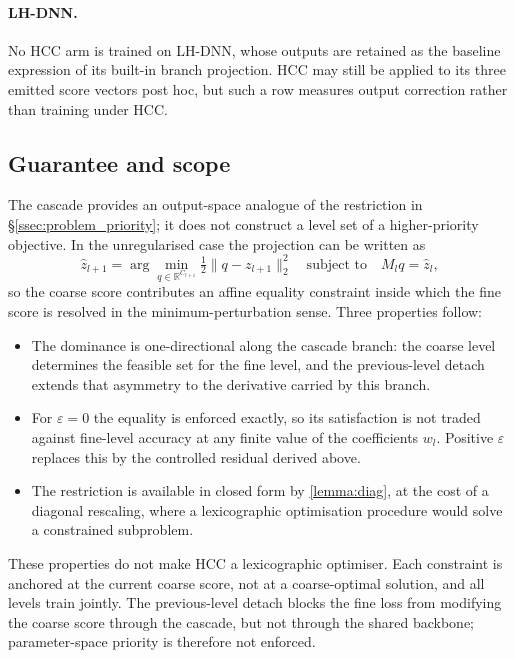 \paragraph{LH-DNN.} No HCC arm is trained on LH-DNN, whose outputs are retained
as the baseline expression of its built-in branch projection. HCC may still be
applied to its three emitted score vectors post hoc, but such a row measures
output correction rather than training under HCC.

\subsection{Guarantee and scope}
\label{ssec:hcc_guarantee}

The cascade provides an output-space analogue of the restriction in
\S\ref{ssec:problem_priority}; it does not construct a level set of a
higher-priority objective. In the unregularised case the projection can be
written as
\[
\hat z_{l+1}
=
\arg\min_{q\in\mathbb{R}^{C_{l+1}}}
\tfrac{1}{2}\lVert q-z_{l+1}\rVert_2^2
\quad\text{subject to}\quad
M_lq=\hat z_l ,
\]
so the coarse score contributes an affine equality constraint inside which the
fine score is resolved in the minimum-perturbation sense. Three
properties follow:
\begin{itemize}
    \item The dominance is one-directional along the cascade branch: the coarse
    level determines the feasible set for the fine level, and the previous-level
    detach extends that asymmetry to the derivative carried by this branch.
    \item For $\varepsilon=0$ the equality is enforced exactly, so its
    satisfaction is not traded against fine-level accuracy at any finite value
    of the coefficients $w_l$. Positive $\varepsilon$ replaces this by the
    controlled residual derived above.
    \item The restriction is available in closed form by \cref{lemma:diag}, at
    the cost of a diagonal
    rescaling, where a lexicographic optimisation procedure would solve a constrained
    subproblem.
\end{itemize}

These properties do not make HCC a lexicographic optimiser. Each constraint is
anchored at the current coarse score, not at a coarse-optimal solution, and all
levels train jointly. The previous-level detach blocks the fine loss from
modifying the coarse score through the cascade, but not through the shared
backbone; parameter-space priority is therefore not enforced.

